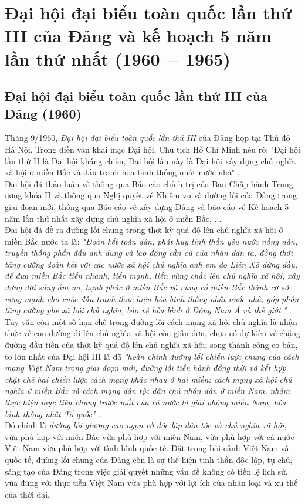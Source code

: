 \section{Đại hội đại biểu toàn quốc lần thứ III của Đảng và kế hoạch 5 năm lần thứ nhất (1960 $-$ 1965)}
\subsection{Đại hội đại biểu toàn quốc lần thứ III của Đảng (1960)}
Tháng 9/1960, \textit{Đại hội đại biểu toàn quốc lần thứ III} của Đảng họp tại Thủ đô Hà Nội. Trong diễn văn khai mạc Đại hội, Chủ tịch Hồ Chí Minh nêu rõ: "Đại hội lần thứ II là Đại hội kháng chiến, Đại hội lần này là Đại hội xây dựng chủ nghĩa xã hội ở miền Bắc và đấu tranh hòa bình thống nhất nước nhà" \supercite{dvkmdh3, HCMtt12}.\\ 
Đại hội đã thảo luận và thông qua Báo cáo chính trị của Ban Chấp hành Trung ương khóa II và thông qua Nghị quyết về Nhiệm vụ và đường lối của Đảng trong giai đoạn mới, thông qua Báo cáo về xây dựng Đảng và báo cáo về Kế hoạch 5 năm lần thứ nhất xây dựng chủ nghĩa xã hội ở miền Bắc, ...\\
Đại hội đã đề ra đường lối chung trong thời kỳ quá độ lên chủ nghĩa xã hội ở miền Bắc nước ta là: \textit{"Đoàn kết toàn dân, phát huy tinh thần yêu nước nồng nàn, truyền thống phấn đấu anh dũng và lao động cần cù của nhân dân ta, đồng thời tăng cường đoàn kết với các nước xã hội chủ nghĩa anh em do Liên Xô đứng đầu, để đưa miền Bắc tiến nhanh, tiến mạnh, tiến vững chắc lên chủ nghĩa xã hội, xây dựng đời sống ấm no, hạnh phúc ở miền Bắc và củng cố miền Bắc thành cơ sở vững mạnh cho cuộc đấu tranh thực hiện hòa bình thống nhất nước nhà, góp phần tăng cường phe xã hội chủ nghĩa, bảo vệ hòa bình ở Đông Nam Á và thế giới."} \supercite{nq1dh3}.\\
Tuy vẫn còn một số hạn chế trong đường lối cách mạng xã hội chủ nghĩa là nhận thức về con đường đi lên chủ nghĩa xã hội còn giản đơn, chưa có dự kiến về chặng đường đầu tiên của thời kỳ quá độ lên chủ nghĩa xã hội; song thành công cơ bản, to lớn nhất của Đại hội III là đã \textit{"hoàn chỉnh đường lối chiến lược chung của cách mạng Việt Nam trong giai đoạn mới, đường lối tiến hành đồng thời và kết hợp chặt chẽ hai chiến lược cách mạng khác nhau ở hai miền: cách mạng xã hội chủ nghĩa ở miền Bắc và cách mạng dân tộc dân chủ nhân dân ở miền Nam, nhằm thực hiện mục tiêu chung trước mắt của cả nước là giải phóng miền Nam, hòa bình thống nhất Tổ quốc"} \supercite{giaotrinh}.\\
Đó chính là \textit{đường lối giương cao ngọn cờ độc lập dân tộc và chủ nghĩa xã hội}, vừa phù hợp với miền Bắc vừa phù hợp với miền Nam, vừa phù hợp với cả nước Việt Nam vừa phù hợp với tình hình quốc tế. Đặt trong bối cảnh Việt Nam và quốc tế, đường lối chung của Đảng còn là sự thể hiện tinh thần độc lập, tự chủ, sáng tạo của Đảng trong việc giải quyết những vấn đề không có tiền lệ lịch sử, vừa đúng với thực tiễn Việt Nam vừa phù hợp với lợi ích của nhân loại và xu thế của thời đại.
